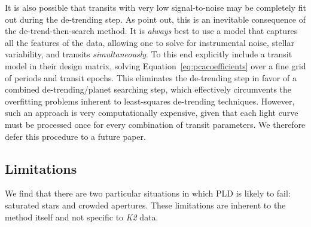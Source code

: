 \documentclass[]{emulateapj}
\begin{document}
It is also possible that transits with very low signal-to-noise may be completely
fit out during the de-trending step. As \cite{DFM15} point out, this is an inevitable
consequence of the de-trend-then-search method. It is \emph{always} best to use
a model that captures all the features of the data, allowing one to solve for 
instrumental noise, stellar variability, and transits \emph{simultaneously}. To this end
\cite{DFM15} explicitly include a transit model in their design matrix, solving
Equation~\ref{eq:pcacoefficients} over a fine grid of periods and transit epochs. This
eliminates the de-trending step in favor of a combined de-trending/planet
searching step, which effectively circumvents the overfitting problems inherent to
least-squares de-trending techniques. However, such an approach is very computationally
expensive, given that each light curve must be processed once for every combination
of transit parameters. We therefore defer this procedure to a future paper.

\subsection{Limitations}
\label{sec:limitations}
We find that there are two particular situations in which PLD is likely to fail: saturated stars
and crowded apertures. These limitations are inherent to the method itself and not
specific to \emph{K2} data.
\end{document}
